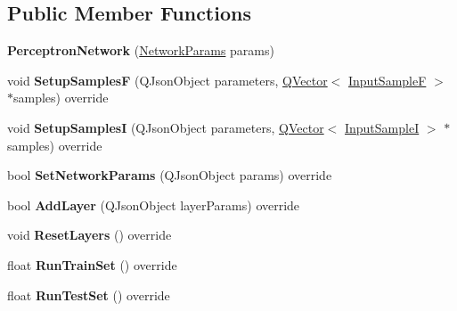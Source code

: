 \subsection*{Public Member Functions}
\begin{DoxyCompactItemize}
\item 
{\bfseries Perceptron\+Network} (\hyperlink{struct_perceptron_1_1_network_params}{Network\+Params} params)\hypertarget{class_perceptron_network_a05ac856c829795664393e9577f0f58b5}{}\label{class_perceptron_network_a05ac856c829795664393e9577f0f58b5}

\item 
void {\bfseries Setup\+SamplesF} (Q\+Json\+Object parameters, \hyperlink{class_q_vector}{Q\+Vector}$<$ \hyperlink{class_q_pair}{Input\+SampleF} $>$ $\ast$samples) override\hypertarget{class_perceptron_network_a34139545d51a95537ecb46819deb348a}{}\label{class_perceptron_network_a34139545d51a95537ecb46819deb348a}

\item 
void {\bfseries Setup\+SamplesI} (Q\+Json\+Object parameters, \hyperlink{class_q_vector}{Q\+Vector}$<$ \hyperlink{class_q_pair}{Input\+SampleI} $>$ $\ast$samples) override\hypertarget{class_perceptron_network_aced7b81e1fb2d69e050f62cabd058ec3}{}\label{class_perceptron_network_aced7b81e1fb2d69e050f62cabd058ec3}

\item 
bool {\bfseries Set\+Network\+Params} (Q\+Json\+Object params) override\hypertarget{class_perceptron_network_afb8e01ac4a933a35abf784d4c00a3f12}{}\label{class_perceptron_network_afb8e01ac4a933a35abf784d4c00a3f12}

\item 
bool {\bfseries Add\+Layer} (Q\+Json\+Object layer\+Params) override\hypertarget{class_perceptron_network_ad5b18f2f4d84fb9fa7941e133a4fb72e}{}\label{class_perceptron_network_ad5b18f2f4d84fb9fa7941e133a4fb72e}

\item 
void {\bfseries Reset\+Layers} () override\hypertarget{class_perceptron_network_a725149f0b03c8a6e07ea2a64c8c98556}{}\label{class_perceptron_network_a725149f0b03c8a6e07ea2a64c8c98556}

\item 
float {\bfseries Run\+Train\+Set} () override\hypertarget{class_perceptron_network_a17cdca41fc873b70bb700b10e32240eb}{}\label{class_perceptron_network_a17cdca41fc873b70bb700b10e32240eb}

\item 
float {\bfseries Run\+Test\+Set} () override\hypertarget{class_perceptron_network_a0f2c75a5cbac4485eef6a0ef942da407}{}\label{class_perceptron_network_a0f2c75a5cbac4485eef6a0ef942da407}

\end{DoxyCompactItemize}
